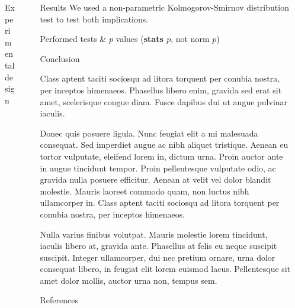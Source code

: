 \documentclass[final,notheorems]{beamer}
\newlength{\sepwidth}
\newlength{\colwidth}
\newcommand{\separatorcolumn}{\begin{column}{\sepwidth}\end{column}}
\begin{document}
\begin{frame}[t]
\begin{columns}[t]
\begin{column}{\colwidth}
\begin{block}{Experimental design}
  \end{block}
\end{column}

\separatorcolumn

\begin{column}{\colwidth}

  \begin{block}{Results}
    We used a non-parametric Kolmogorov-Smirnov distribution test to test both implications.
    \begin{table}
      \caption{Performed tests & $p$ values (\textbf{stats $p$}, not norm $p$)}
    \end{table}
  \end{block}

  \begin{alertblock}{Conclusion}

    Class aptent taciti sociosqu ad litora torquent per conubia nostra, per
    inceptos himenaeos. Phasellus libero enim, gravida sed erat sit amet,
    scelerisque congue diam. Fusce dapibus dui ut augue pulvinar iaculis.



    Donec quis posuere ligula. Nunc feugiat elit a mi malesuada consequat. Sed
    imperdiet augue ac nibh aliquet tristique. Aenean eu tortor vulputate,
    eleifend lorem in, dictum urna. Proin auctor ante in augue tincidunt
    tempor. Proin pellentesque vulputate odio, ac gravida nulla posuere
    efficitur. Aenean at velit vel dolor blandit molestie. Mauris laoreet
    commodo quam, non luctus nibh ullamcorper in. Class aptent taciti sociosqu
    ad litora torquent per conubia nostra, per inceptos himenaeos.

    Nulla varius finibus volutpat. Mauris molestie lorem tincidunt, iaculis
    libero at, gravida ante. Phasellus at felis eu neque suscipit suscipit.
    Integer ullamcorper, dui nec pretium ornare, urna dolor consequat libero,
    in feugiat elit lorem euismod lacus. Pellentesque sit amet dolor mollis,
    auctor urna non, tempus sem.

  \end{alertblock}

  \begin{block}{References}
    \footnotesize{\printbibliography}

  \end{block}

\end{column}

\separatorcolumn
\end{columns}
\end{frame}
\end{document}
